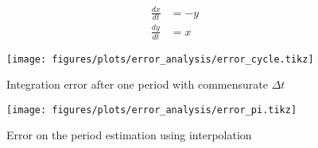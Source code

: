\begin{align}\label{eq:circle}
    \frac{dx}{dt} &= -y \nonumber \\
    \frac{dy}{dt} &= x
\end{align}

\begin{figure}[H]
    \centering
    \texttt{[image: figures/plots/error\_analysis/error\_cycle.tikz]}
    \caption{Integration error after one period with commensurate $\Delta t$}%
    \label{fig:error_cycle}
\end{figure}

\begin{figure}[H]
    \centering
    \texttt{[image: figures/plots/error\_analysis/error\_pi.tikz]}
    \caption{Error on the period estimation using interpolation}%
    \label{fig:error_pi}
\end{figure}
